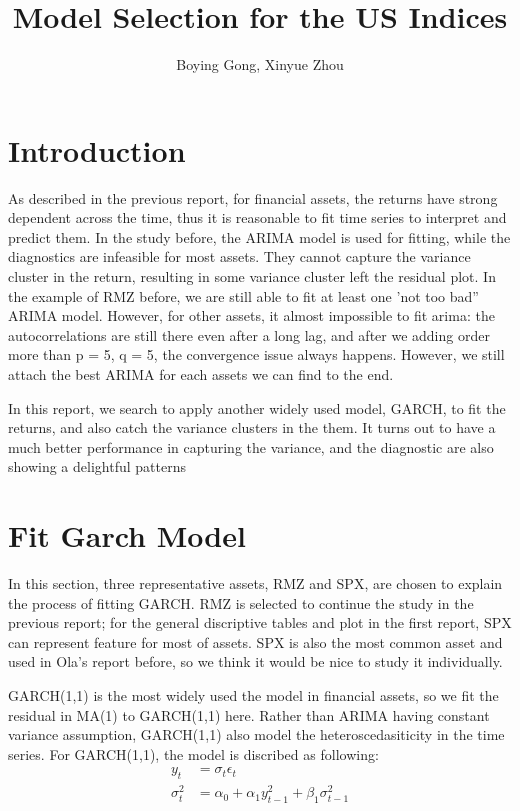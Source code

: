 \documentclass[12pt]{article}
\title{Model Selection for the US Indices}
\author{Boying Gong, Xinyue Zhou}
\begin{document}
\maketitle

\section{Introduction}
As described in the previous report, for financial assets, the returns have strong dependent across the time, thus it is reasonable to fit time series to interpret and predict them. In the study before,  the ARIMA model is used for fitting, while the diagnostics are infeasible for most assets. They cannot capture the variance cluster in the return, resulting in some variance cluster left the residual plot. In the example of RMZ  before, we are still able to fit at least one 'not too bad'' ARIMA model. However, for other assets, it almost impossible to fit arima: the autocorrelations are still there even after a long lag, and after we adding order more than p = 5, q = 5, the convergence issue always happens. However, we still attach the best ARIMA for each assets we can find to the end.

In this report, we search to apply another widely used model, GARCH,  to fit the returns, and also catch the variance clusters in the them. It turns out to have a much better performance in capturing the variance, and the diagnostic are also showing a delightful patterns


\section{Fit Garch Model}
In this section,  three representative assets, RMZ and SPX, are chosen to explain the process of fitting GARCH. RMZ is selected to continue the study in the previous report; for the general discriptive tables and plot in the first report, SPX can represent feature for most of assets. SPX is also the most common asset and used in Ola's report before, so we think it would be nice to study it individually.

GARCH(1,1) is the most widely used the model in financial assets, so we fit the residual in MA(1) to GARCH(1,1) here. Rather than ARIMA having constant variance assumption, GARCH(1,1) also model the heteroscedasiticity in the time series.  For GARCH(1,1), the model is discribed as following:
\begin{align*}
y_t & = \sigma_t \epsilon_t\\
\sigma_t^2 & = \alpha_0+ \alpha_1 y_{t-1}^2 +\beta_1\sigma_{t-1}^2
\end{align*}
\end{document}
